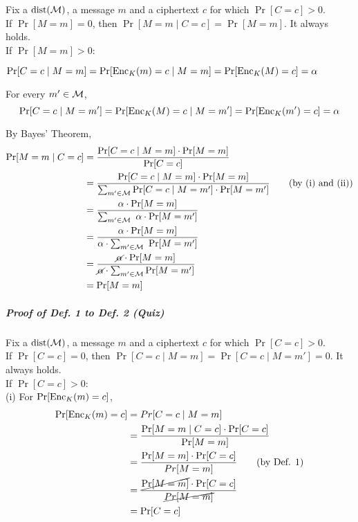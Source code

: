 Fix a \(\operatorname{dist}(\operatorname{\mathcal{M}})\), a message \(m\) and a ciphertext \(c\) for which \(\Pr[C = c] > 0\). \\
If \(\Pr[M = m] = 0\), then \(\Pr[M = m \mid C = c] = \Pr[M = m]\). It always holds. \\
If \(\Pr[M = m] > 0\):
\begin{myEnumerate}[label=(\roman*)]
	\item \( \Pr[C = c \mid M = m] = \Pr[\operatorname{Enc}_K(m) = c \mid M = m] = \Pr[\operatorname{Enc}_K(M) = c] = \mathbf{\alpha} \)
	
	\item For every \(m' \in \operatorname{\mathcal{M}}\),
	\[ \Pr[C = c \mid M = m'] = \Pr[\operatorname{Enc}_K(M) = c \mid M = m'] = \Pr[\operatorname{Enc}_K(m') = c] = \mathbf{\alpha} \]
	
	\item By Bayes' Theorem, 
	\begingroup
	\addtolength{\jot}{1em}
	\begin{align*}
		\Pr[M = m \mid C = c]
				&= \frac{\Pr[C = c \mid M = m] \cdot \Pr[M = m]}{\Pr[C = c]} \\
				&= \frac{\Pr[C = c \mid M = m] \cdot \Pr[M = m]}{\sum_{m' \in \operatorname{\mathcal{M}}} \Pr[C = c \mid M = m'] \cdot \Pr[M = m']} \tag{by (i) and (ii)}\\
				& = \frac{\alpha \cdot \Pr[M = m]}{\sum_{m' \in \operatorname{\mathcal{M}}} \ \alpha \cdot \Pr[M = m']} \\
				& = \frac{\alpha \cdot \Pr[M = m]}{\alpha \cdot \sum_{m' \in \operatorname{\mathcal{M}}} \ \Pr[M = m']} \\
				& = \frac{\cancel\alpha \cdot \Pr[M = m]}{\cancel\alpha \cdot \sum_{m' \in \operatorname{\mathcal{M}}} \Pr[M = m']} \\
				& = \Pr[M = m]
	\end{align*}
	\endgroup
\end{myEnumerate}

\pagebreak

\subparagraph{Proof of Def. 1 to Def. 2 (Quiz)}

Fix a \(\operatorname{dist}(\operatorname{\mathcal{M}})\), a message \(m\) and a ciphertext \(c\) for which \(\Pr[C = c] > 0\). \\
If \(\Pr[C = c] = 0\), then \(\Pr[C = c \mid M = m] = \Pr[C = c \mid M = m'] = 0\). It always holds. \\
If \(\Pr[C = c] > 0\): \\
(i) For \(\Pr[\operatorname{Enc}_K(m) = c]\),
\begin{align*}
	\Pr[\operatorname{Enc}_K(m) = c] &= Pr[C = c \mid M = m]\\
	&= \frac{\Pr[M = m \mid C = c] \cdot \Pr[C = c]}{\Pr[M = m]} \\
	&= \frac{\Pr[M = m] \cdot \Pr[C =c]}{Pr[M = m]} \tag{by Def. 1}\\
	&= \frac{\cancel{\Pr[M = m]} \cdot \Pr[C = c]}{\cancel{Pr[M = m]}} \\
	&= \Pr[C = c]
\end{align*}

